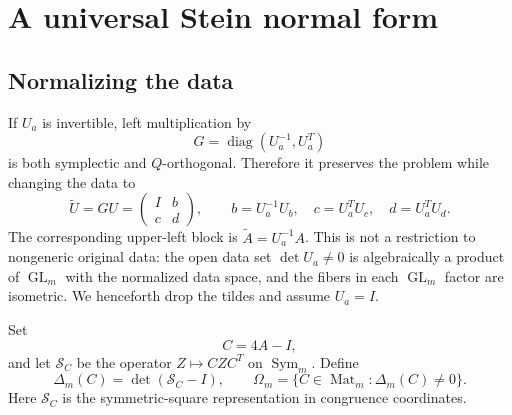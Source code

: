 \documentclass[11pt]{article}
\theoremstyle{remark}\newtheorem{remark}[theorem]{Remark}
\DeclareMathOperator{\Sym}{Sym}
\DeclareMathOperator{\Mat}{Mat}
\DeclareMathOperator{\GL}{GL}
\DeclareMathOperator{\diag}{diag}
\begin{document}
\section{A universal Stein normal form}\label{sec:stein}
\subsection{Normalizing the data}
If $U_a$ is invertible, left multiplication by
\[
G=\diag(U_a^{-1},U_a^T)
\]
is both symplectic and $Q$-orthogonal. Therefore it preserves the problem while changing the data to
\begin{equation}\label{eq:normalized-data}
\widetilde U=GU=\begin{pmatrix}I&b\\c&d\end{pmatrix},\qquad
b=U_a^{-1}U_b,\quad c=U_a^TU_c,\quad d=U_a^TU_d.
\end{equation}
The corresponding upper-left block is $\widetilde A=U_a^{-1}A$. This is not a restriction to nongeneric original data: the open data set $\det U_a\ne0$ is algebraically a product of $\GL_m$ with the normalized data space, and the fibers in each $\GL_m$ factor are isometric. We henceforth drop the tildes and assume $U_a=I$.

Set
\begin{equation}\label{eq:C}
C=4A-I,
\end{equation}
and let $\mathcal S_C$ be the operator $Z\mapsto CZC^T$ on $\Sym_m$. Define
\begin{equation}\label{eq:delta}
\Delta_m(C)=\det(\mathcal S_C-I),\qquad
\Omega_m=\{C\in\Mat_m:\Delta_m(C)\ne0\}.
\end{equation}
Here $\mathcal S_C$ is the symmetric-square representation in congruence coordinates.
\end{document}
